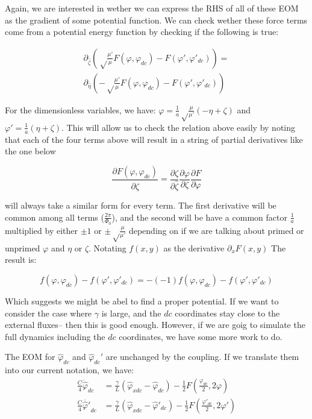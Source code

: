 \documentclass[paper=a4, twocolumn, fontsize=10pt]{article} %
\numberwithin{equation}{section} %
\numberwithin{figure}{section} %
\numberwithin{table}{section} %
\def \df#1{\hat{#1}}
\def \dl#1{#1}
\begin{document}
Again, we are interested in wether we can express the RHS of all of these EOM as the gradient of some potential function. We can check wether these force terms come from a potential energy function by checking if the following is true:

\begin{align}
 \partial_{\df\zeta} \left(  \sqrt\frac{\mu'}{\mu} F(\dl\varphi, \dl\varphi_{dc}) - F(\dl\varphi', \dl\varphi'_{dc})\right) =  \\
 \partial_{\df\eta} \left( -   \sqrt\frac{\mu'}{\mu}F(\dl\varphi, \dl\varphi_{dc}) - F(\dl\varphi', \dl\varphi'_{dc})\right) 
 \end{align}


For the dimensionless variables,  we have: $\dl\varphi =\frac{1}{a}  \sqrt\frac{\mu}{\mu'}  (-\dl\eta+\dl\zeta)$ and $\dl\varphi' =\frac{1}{a} (\dl\eta+\dl\zeta)$. This will allow us to check the relation above easily by noting that each of the four terms above will result in a string of partial derivatives like the one below

\[ \frac{\partial F(\dl\varphi,\dl\varphi_{dc})}{\partial \df\zeta}  =\frac{\partial \dl\zeta}{\partial \df\zeta} \frac{\partial \dl\varphi}{\partial \dl\zeta} \frac{\partial F}{\partial \dl\varphi} \]

will always take a similar form for every term. The first derivative will be common among all terms ($\frac{2\pi}{\Phi_0}$), and the second will be have a common factor $\frac{1}{a}$ multiplied by either $\pm 1$ or $\pm \sqrt\frac{\mu}{\mu'}$ depending on if we are talking about primed or unprimed $\dl\varphi$ and $\dl\eta$ or $\dl\zeta$. Notating $f(x,y)$ as the derivative $\partial_x F(x,y)$ The result is:

\[ f(\dl\varphi, \dl\varphi_{dc}) -  f(\dl\varphi', \dl\varphi'_{dc}) = - \left(-1\right) f(\dl\varphi, \dl\varphi_{dc}) - f(\dl\varphi', \dl\varphi'_{dc})\]

Which suggests we might be abel to find a proper potential. If we want to consider the case where $\gamma$ is large, and the $dc$ coordinates stay close to the external fluxes-- then this is good enough. However, if we are goig to simulate the full dynamics including the $dc$ coordinates, we have some more work to do.

The EOM for $\df\varphi_{dc}$ and $\df\varphi_{dc}'$ are unchanged by the coupling. If we translate them into our current notation, we have:
\begin{align}
\frac{C}{4} \ddot{\df\varphi}_{dc} &= \frac{\gamma}{L}\left( \df\varphi_{xdc} -\df\varphi_{dc}\right) -  \frac{1}{2} F(\frac{\dl\varphi_{dc}}{2}, 2\dl\varphi) \\
\frac{C}{4} \ddot{\df\varphi'}_{dc} &= \frac{\gamma}{L}\left( \df\varphi_{xdc} -\df\varphi'_{dc}\right) -  \frac{1}{2}F(\frac{\dl\varphi'_{dc}}{2}, 2\dl\varphi')
\end{align}
\end{document}
